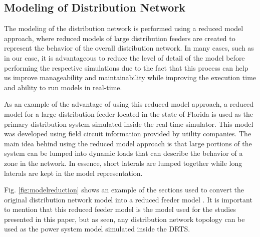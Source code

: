 \subsection{Modeling of Distribution Network}
The modeling of the distribution network is performed using a reduced model approach, where reduced models of large distribution feeders are created to represent the behavior of the overall distribution network. In many cases, such as in our case, it is advantageous to reduce the level of detail of the model before performing the respective simulations due to the fact that this process can help us improve manageability and maintainability while improving the execution time and ability to run models in real-time. 

As an example of the advantage of using this reduced model approach, a reduced model for a large distribution feeder located in the state of Florida is used as the primary distribution system simulated inside the real-time simulator. This model was developed using field circuit information provided by utility companies. The main idea behind using the reduced model approach is that large portions of the system can be lumped into dynamic loads that can describe the behavior of a zone in the network. In essence, short laterals are lumped together while long laterals are kept in the model representation.

Fig. \ref{fig:modelreduction} shows an example of the sections used to convert the original distribution network model into a reduced feeder model \cite{sungrin}. It is important to mention that this reduced feeder model is the model used for the studies presented in this paper, but as seen, any distribution network topology can be used as the power system model simulated inside the DRTS.



